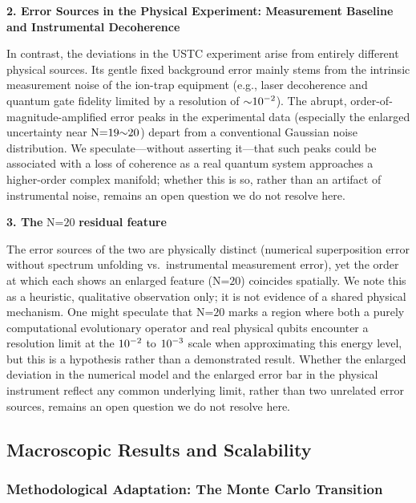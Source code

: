 \documentclass[fractalfract,article,submit,oneauthor,pdftex]{Definitions/mdpi}
\begin{document}
\textbf{2. Error Sources in the Physical Experiment: Measurement Baseline
and Instrumental Decoherence}

In contrast, the deviations in the USTC experiment arise from
entirely different physical sources. Its gentle fixed background error
mainly stems from the intrinsic measurement noise of the ion-trap
equipment (e.g., laser decoherence and quantum gate fidelity limited by
a resolution of \(\text{\ensuremath{\sim}}\text{10}^{\text{\ensuremath{-}2}}\)). The
abrupt, order-of-magnitude-amplified error peaks in the
experimental data (especially the enlarged uncertainty near
\(\text{N}\text{=19\ensuremath{\sim}20}\)) depart from a conventional Gaussian noise
distribution. We speculate---without asserting it---that such peaks
could be associated with a loss of coherence as a real quantum system
approaches a higher-order complex manifold; whether this is so, rather
than an artifact of instrumental noise, remains an open question we do
not resolve here.

\textbf{3. The} \(\text{N}\text{=20}\)
\textbf{residual feature}

The error sources of the two are physically distinct
(numerical superposition error without spectrum unfolding vs.~instrumental
measurement error), yet the order at which each shows an enlarged feature
(\(\text{N}\text{=20}\)) coincides spatially. We note this as a heuristic,
qualitative observation only; it is not evidence of a shared physical
mechanism. One might speculate that \(\text{N}\text{=20}\) marks a region
where both a purely computational evolutionary operator and real physical
qubits encounter a resolution limit at the \(\text{10}^{\text{\ensuremath{-}2}}\) to
\(\text{10}^{\text{\ensuremath{-}3}}\) scale when approximating this energy level, but
this is a hypothesis rather than a demonstrated result. Whether the enlarged
deviation in the numerical model and the enlarged error bar in the physical
instrument reflect any common underlying limit, rather than two unrelated
error sources, remains an open question we do not resolve here.

\subsection{Macroscopic Results and Scalability}

\subsubsection{Methodological Adaptation: The Monte Carlo Transition}
\end{document}
